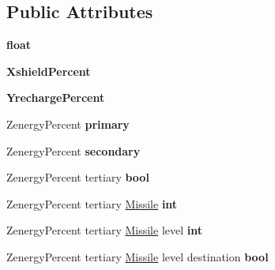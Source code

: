 \subsection*{Public Attributes}
\begin{DoxyCompactItemize}
\item 
{\bfseries float}\hypertarget{classUnitWrapper_a4d4f66507bc7b93e54fdc49efc5a442c}{}\label{classUnitWrapper_a4d4f66507bc7b93e54fdc49efc5a442c}

\item 
{\bfseries Xshield\+Percent}\hypertarget{classUnitWrapper_aa867090c299a005f3cf65eb12e4b5c88}{}\label{classUnitWrapper_aa867090c299a005f3cf65eb12e4b5c88}

\item 
{\bfseries Yrecharge\+Percent}\hypertarget{classUnitWrapper_a35652211ebf6e97e5ccb4d50a9ad90e9}{}\label{classUnitWrapper_a35652211ebf6e97e5ccb4d50a9ad90e9}

\item 
Zenergy\+Percent {\bfseries primary}\hypertarget{classUnitWrapper_a6ec4bd289a3b9ee3636b27d3c88d5f39}{}\label{classUnitWrapper_a6ec4bd289a3b9ee3636b27d3c88d5f39}

\item 
Zenergy\+Percent {\bfseries secondary}\hypertarget{classUnitWrapper_aa897184c72b1b183757ec45de1db1c48}{}\label{classUnitWrapper_aa897184c72b1b183757ec45de1db1c48}

\item 
Zenergy\+Percent tertiary {\bfseries bool}\hypertarget{classUnitWrapper_a14d84ac7bc8e2540098a4e0b28697488}{}\label{classUnitWrapper_a14d84ac7bc8e2540098a4e0b28697488}

\item 
Zenergy\+Percent tertiary \hyperlink{classMissile}{Missile} {\bfseries int}\hypertarget{classUnitWrapper_a3aafb4da37557e29878b68318e8ef2d8}{}\label{classUnitWrapper_a3aafb4da37557e29878b68318e8ef2d8}

\item 
Zenergy\+Percent tertiary \hyperlink{classMissile}{Missile} level {\bfseries int}\hypertarget{classUnitWrapper_a2fe181391aa771bbbd78212102ed35f1}{}\label{classUnitWrapper_a2fe181391aa771bbbd78212102ed35f1}

\item 
Zenergy\+Percent tertiary \hyperlink{classMissile}{Missile} level destination {\bfseries bool}\hypertarget{classUnitWrapper_ada0e6f410531cd57effa5ff2d2bc92c1}{}\label{classUnitWrapper_ada0e6f410531cd57effa5ff2d2bc92c1}


\end{DoxyCompactItemize}
